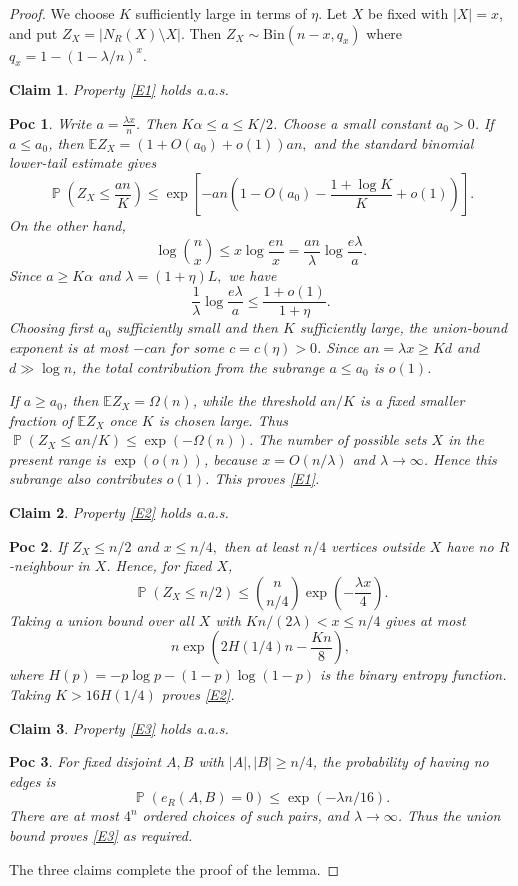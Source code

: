 \documentclass[10pt,a4paper]{amsart}
\newtheorem{claim}{Claim}
\newtheorem{poc}{Poc}
\renewcommand\Pr{\operatorname{\mathbb{P}}}
\renewcommand\ge{\geqslant}
\renewcommand\le{\leqslant}
\begin{document}
\begin{proof}
We choose $K$ sufficiently large in terms of $\eta$. Let $X$ be fixed with $|X|=x$, and put $Z_{X}=|N_{R}(X)\setminus X|$. Then $Z_{X}\sim \text{Bin}(n-x,q_{x})$ where $q_{x}=1-(1-\lambda/n)^{x}$.

\begin{claim}\label{claim:e1}
Property \ref{E1} holds a.a.s.
\end{claim}
\begin{poc}
Write $a=\frac{\lambda x}{n}$. Then $K\alpha \le a\le K/2$. Choose a small constant $a_{0}>0$. If $a\le a_{0}$, then $\mathbb{E}Z_{X}=(1+O(a_{0})+o(1))an,$ and the standard binomial lower-tail estimate gives
$$\Pr\left(Z_{X}\le\frac{an}{K}\right)\le \exp\left[-an\left(1-O(a_{0})-\frac{1+\log K}{K}+o(1)\right)\right].$$
On the other hand,
$$\log\binom{n}{x}\le x \log\frac{en}{x}=\frac{an}{\lambda}\log\frac{e\lambda}{a}.$$
Since $a\ge K\alpha$ and $\lambda=(1+\eta)L,$ we have
$$\frac{1}{\lambda}\log\frac{e\lambda}{a}\le\frac{1+o(1)}{1+\eta}.$$
Choosing first $a_{0}$ sufficiently small and then $K$ sufficiently large, the union-bound exponent is at most $-can$ for some $c=c(\eta)>0$. Since $an=\lambda x\ge Kd$ and $d\gg \log n$, the total contribution from the subrange $a\le a_{0}$ is $o(1)$.

If $a\ge a_{0}$, then $\mathbb{E}Z_{X}=\Omega(n)$, while the threshold $an/K$ is a fixed smaller fraction of $\mathbb{E}Z_{X}$ once $K$ is chosen large. Thus $\Pr(Z_{X}\le an/K)\le \exp(-\Omega(n))$. The number of possible sets $X$ in the present range is $\exp(o(n))$, because $x=O(n/\lambda)$ and $\lambda\rightarrow\infty$. Hence this subrange also contributes $o(1)$. This proves \ref{E1}.
\end{poc}

\begin{claim}\label{claim:e2}
Property \ref{E2} holds a.a.s.
\end{claim}
\begin{poc}
If $Z_{X}\le n/2$ and $x\le n/4,$ then at least $n/4$ vertices outside $X$ have no $R$-neighbour in $X$. Hence, for fixed $X$,
$$\Pr(Z_{X}\le n/2)\le\binom{n}{n/4}\exp\left(-\frac{\lambda x}{4}\right).$$
Taking a union bound over all $X$ with $Kn/(2\lambda)<x\le n/4$ gives at most
$$n \exp\left(2H(1/4)n-\frac{Kn}{8}\right),$$
where $H(p)=-p\log p-(1-p)\log(1-p)$ is the binary entropy function. Taking $K>16H(1/4)$ proves \ref{E2}.
\end{poc}

\begin{claim}\label{claim:e3}
Property \ref{E3} holds a.a.s.
\end{claim}
\begin{poc}
For fixed disjoint $A, B$ with $|A|,|B|\ge n/4$, the probability of having no edges is
$$\Pr(e_{R}(A,B)=0)\le \exp(-\lambda n/16).$$
There are at most $4^{n}$ ordered choices of such pairs, and $\lambda\rightarrow\infty$. Thus the union bound proves \ref{E3} as required.
\end{poc}

The three claims complete the proof of the lemma.
\end{proof}
\end{document}
